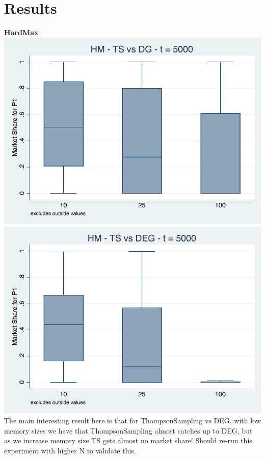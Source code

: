 \documentclass[11pt,letterpaper]{article}
\begin{document}
\pagebreak
\section*{Results}
\textbf{HardMax} \\
\includegraphics[scale=0.9]{hm_ts_dg_memory_5000} \\ \includegraphics[scale=0.9]{hm_ts_deg_memory_5000} \\
The main interesting result here is that for ThompsonSampling vs DEG, with low memory sizes we have that ThompsonSampling almost catches up to DEG, but as we increase memory size TS gets almost no market share! Should re-run this experiment with higher N to validate this. 
\end{document}

